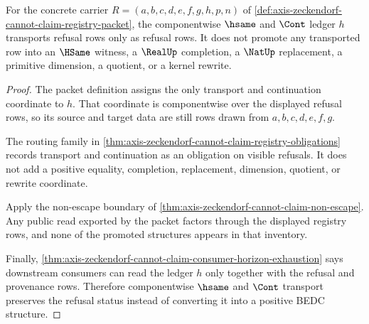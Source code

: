 \begin{theorem}
\label{thm:axis-zeckendorf-cannot-claim-transport-nonpromotion}
For the concrete carrier $R=(a,b,c,d,e,f,g,h,p,n)$ of \autoref{def:axis-zeckendorf-cannot-claim-registry-packet}, the componentwise $\hsame$ and $\Cont$ ledger $h$ transports refusal rows only as refusal rows. It does not promote any transported row into an $\HSame$ witness, a $\RealUp$ completion, a $\NatUp$ replacement, a primitive dimension, a quotient, or a kernel rewrite.
\end{theorem}
\begin{proof}
The packet definition assigns the only transport and continuation coordinate to $h$. That coordinate is componentwise over the displayed refusal rows, so its source and target data are still rows drawn from $a,b,c,d,e,f,g$.

The routing family in \autoref{thm:axis-zeckendorf-cannot-claim-registry-obligations} records transport and continuation as an obligation on visible refusals. It does not add a positive equality, completion, replacement, dimension, quotient, or rewrite coordinate.

Apply the non-escape boundary of \autoref{thm:axis-zeckendorf-cannot-claim-non-escape}. Any public read exported by the packet factors through the displayed registry rows, and none of the promoted structures appears in that inventory.

Finally, \autoref{thm:axis-zeckendorf-cannot-claim-consumer-horizon-exhaustion} says downstream consumers can read the ledger $h$ only together with the refusal and provenance rows. Therefore componentwise $\hsame$ and $\Cont$ transport preserves the refusal status instead of converting it into a positive BEDC structure.
\end{proof}

